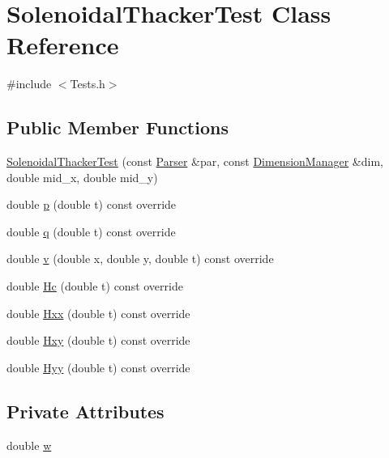 \hypertarget{classSolenoidalThackerTest}{}\section{Solenoidal\+Thacker\+Test Class Reference}
\label{classSolenoidalThackerTest}


{\ttfamily \#include $<$Tests.\+h$>$}

\subsection*{Public Member Functions}
\begin{DoxyCompactItemize}
\item 
\hyperlink{classSolenoidalThackerTest_ae62eea45eef40d24e4becf63fd04dbdb}{Solenoidal\+Thacker\+Test} (const \hyperlink{structParser}{Parser} \&par, const \hyperlink{structDimensionManager}{Dimension\+Manager} \&dim, double mid\+\_\+x, double mid\+\_\+y)
\item 
double \hyperlink{classSolenoidalThackerTest_a15f701fed7e7e58ed0f38b000d0e4c60}{p} (double t) const override
\item 
double \hyperlink{classSolenoidalThackerTest_af0ae968cf43321ae5a6de214c5a9d421}{q} (double t) const override
\item 
double \hyperlink{classSolenoidalThackerTest_a87487f308128e5ca961481dd75da6abf}{v} (double x, double y, double t) const override
\item 
double \hyperlink{classSolenoidalThackerTest_a381f6b858454265337bf63e4e615f3cb}{Hc} (double t) const override
\item 
double \hyperlink{classSolenoidalThackerTest_adf33889c1fe87e10802f321c509aceb7}{Hxx} (double t) const override
\item 
double \hyperlink{classSolenoidalThackerTest_a8bbfec9bd72ad250dcf229742646754f}{Hxy} (double t) const override
\item 
double \hyperlink{classSolenoidalThackerTest_af5a3b7eb4581a2362307105ea74f25f0}{Hyy} (double t) const override
\end{DoxyCompactItemize}
\subsection*{Private Attributes}
\begin{DoxyCompactItemize}
\item 
double \hyperlink{classSolenoidalThackerTest_a345933b23bbeb284aafa1c38d1600ff9}{w}
\end{DoxyCompactItemize}
